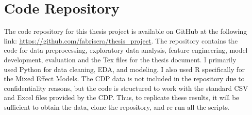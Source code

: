 \section{Code Repository}
\label{sec:code-repo}

The code repository for this thesis project is available on GitHub at the following link: \url{https://github.com/fabrisera/thesis_project}. The repository contains the code for data preprocessing, exploratory data analysis, feature engineering, model development, evaluation and the Tex files for the thesis document. I primarily used Python for data cleaning, EDA, and modeling. I also used R specifically for the Mixed Effect Models. The CDP data is not included in the repository due to confidentiality reasons, but the code is structured to work with the standard CSV and Excel files provided by the CDP. Thus, to replicate these results, it will be sufficient to obtain the data, clone the repository, and re-run all the scripts.
